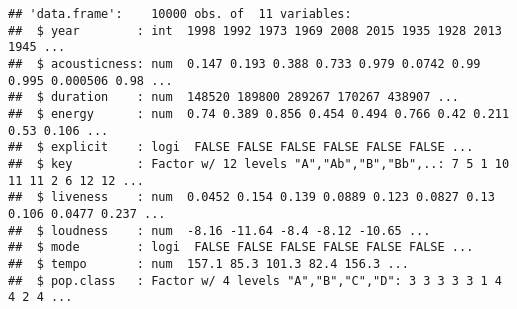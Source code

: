 \documentclass[
  12pt,
]{article}
\newenvironment{Shaded}{\begin{snugshade}}{\end{snugshade}}
\newcommand{\AttributeTok}[1]{\textcolor[rgb]{0.77,0.63,0.00}{#1}}
\newcommand{\ControlFlowTok}[1]{\textcolor[rgb]{0.13,0.29,0.53}{\textbf{#1}}}
\newcommand{\FunctionTok}[1]{\textcolor[rgb]{0.00,0.00,0.00}{#1}}
\newcommand{\NormalTok}[1]{#1}
\newcommand{\OtherTok}[1]{\textcolor[rgb]{0.56,0.35,0.01}{#1}}
\newcommand{\SpecialCharTok}[1]{\textcolor[rgb]{0.00,0.00,0.00}{#1}}
\newcommand{\StringTok}[1]{\textcolor[rgb]{0.31,0.60,0.02}{#1}}
\begin{document}
\begin{Shaded}
\end{Shaded}

\begin{verbatim}
## 'data.frame':    10000 obs. of  11 variables:
##  $ year        : int  1998 1992 1973 1969 2008 2015 1935 1928 2013 1945 ...
##  $ acousticness: num  0.147 0.193 0.388 0.733 0.979 0.0742 0.99 0.995 0.000506 0.98 ...
##  $ duration    : num  148520 189800 289267 170267 438907 ...
##  $ energy      : num  0.74 0.389 0.856 0.454 0.494 0.766 0.42 0.211 0.53 0.106 ...
##  $ explicit    : logi  FALSE FALSE FALSE FALSE FALSE FALSE ...
##  $ key         : Factor w/ 12 levels "A","Ab","B","Bb",..: 7 5 1 10 11 11 2 6 12 12 ...
##  $ liveness    : num  0.0452 0.154 0.139 0.0889 0.123 0.0827 0.13 0.106 0.0477 0.237 ...
##  $ loudness    : num  -8.16 -11.64 -8.4 -8.12 -10.65 ...
##  $ mode        : logi  FALSE FALSE FALSE FALSE FALSE FALSE ...
##  $ tempo       : num  157.1 85.3 101.3 82.4 156.3 ...
##  $ pop.class   : Factor w/ 4 levels "A","B","C","D": 3 3 3 3 3 1 4 4 2 4 ...
\end{verbatim}
\end{document}
